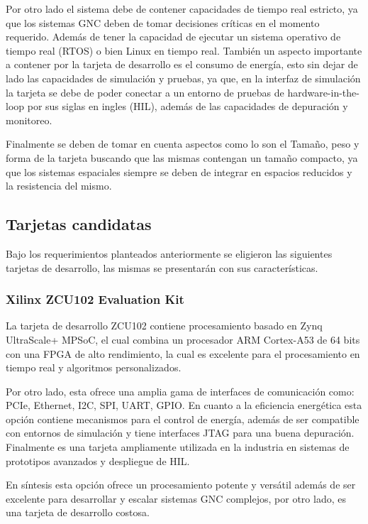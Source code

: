 Por otro lado el sistema debe de contener capacidades de tiempo real estricto, ya que los sistemas GNC deben de tomar decisiones críticas en el momento requerido. Además de tener la capacidad de ejecutar un sistema operativo de tiempo real (RTOS) o bien Linux en tiempo real. También un aspecto importante a contener por la tarjeta de desarrollo es el consumo de energía, esto sin dejar de lado las capacidades de simulación y pruebas, ya que, en la interfaz de simulación la tarjeta se debe de poder conectar a un entorno de pruebas de hardware-in-the-loop por sus siglas en ingles (HIL), además de las capacidades de depuración y monitoreo.

Finalmente se deben de tomar en cuenta aspectos como lo son el Tamaño, peso y forma de la tarjeta buscando que las mismas contengan un tamaño compacto, ya que los sistemas espaciales siempre se deben de integrar en espacios reducidos y la resistencia del mismo.

\subsection{Tarjetas candidatas}
Bajo los requerimientos planteados anteriormente se eligieron las siguientes tarjetas de desarrollo, las mismas se presentarán con sus características.

\subsubsection{Xilinx ZCU102 Evaluation Kit}

La tarjeta de desarrollo ZCU102 contiene procesamiento basado en Zynq UltraScale+ MPSoC, el cual combina un procesador ARM Cortex-A53 de 64 bits con una FPGA de alto rendimiento, la cual es excelente para el procesamiento en tiempo real y algoritmos personalizados.

Por otro lado, esta ofrece una amplia gama de interfaces de comunicación como: PCIe, Ethernet, I2C, SPI, UART, GPIO. En cuanto a la eficiencia energética esta opción contiene mecanismos para el control de energía, además de ser compatible con entornos de simulación y tiene interfaces JTAG para una buena depuración. Finalmente es una tarjeta ampliamente utilizada en la industria en sistemas de prototipos avanzados y despliegue de HIL.

En síntesis esta opción ofrece un procesamiento potente y versátil además de ser excelente para desarrollar y escalar sistemas GNC complejos, por otro lado, es una tarjeta de desarrollo costosa.

